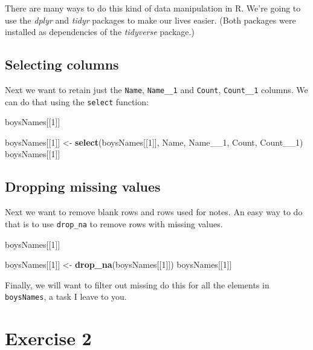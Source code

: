 \documentclass[]{book}
\newenvironment{Shaded}{\begin{snugshade}}{\end{snugshade}}
\newcommand{\KeywordTok}[1]{\textcolor[rgb]{0.13,0.29,0.53}{\textbf{#1}}}
\newcommand{\DecValTok}[1]{\textcolor[rgb]{0.00,0.00,0.81}{#1}}
\newcommand{\StringTok}[1]{\textcolor[rgb]{0.31,0.60,0.02}{#1}}
\newcommand{\NormalTok}[1]{#1}
\begin{document}
There are many ways to do this kind of data manipulation in R. We're
going to use the \emph{dplyr} and \emph{tidyr} packages to make our
lives easier. (Both packages were installed as dependencies of the
\emph{tidyverse} package.)

\subsection{Selecting columns}\label{selecting-columns}

Next we want to retain just the \texttt{Name}, \texttt{Name\_\_1} and
\texttt{Count}, \texttt{Count\_\_1} columns. We can do that using the
\texttt{select} function:

\begin{Shaded}
\begin{Highlighting}[]
\NormalTok{boysNames[[}\DecValTok{1}\NormalTok{]]}

\NormalTok{boysNames[[}\DecValTok{1}\NormalTok{]] <-}\StringTok{ }\KeywordTok{select}\NormalTok{(boysNames[[}\DecValTok{1}\NormalTok{]], Name, Name__}\DecValTok{1}\NormalTok{, Count, Count__}\DecValTok{1}\NormalTok{)}
\NormalTok{boysNames[[}\DecValTok{1}\NormalTok{]]}
\end{Highlighting}
\end{Shaded}

\subsection{Dropping missing values}\label{dropping-missing-values}

Next we want to remove blank rows and rows used for notes. An easy way
to do that is to use \texttt{drop\_na} to remove rows with missing
values.

\begin{Shaded}
\begin{Highlighting}[]
\NormalTok{boysNames[[}\DecValTok{1}\NormalTok{]]}

\NormalTok{boysNames[[}\DecValTok{1}\NormalTok{]] <-}\StringTok{ }\KeywordTok{drop_na}\NormalTok{(boysNames[[}\DecValTok{1}\NormalTok{]])}
\NormalTok{boysNames[[}\DecValTok{1}\NormalTok{]]}
\end{Highlighting}
\end{Shaded}

Finally, we will want to filter out missing do this for all the elements
in \texttt{boysNames}, a task I leave to you.

\section{Exercise 2}\label{exercise-2-2}
\end{document}
